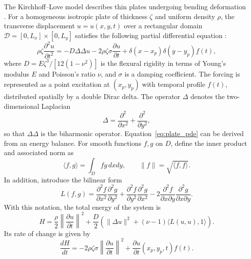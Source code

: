 The Kirchhoff--Love model describes thin plates undergoing bending deformation \cite{love_small_1888}. For a homogeneous isotropic plate of thickness $\zeta$ and uniform density $\rho$, the transverse displacement $u = u(x,y,t)$ over a rectangular domain ${\mathcal D} = [0,L_x]\times[0,L_y]$ satisfies the following partial differential equation \cite{graff_wave_1991,bilbao_numerical_2009}:
%
\begin{equation}
\rho \zeta \frac{\partial^2 u}{\partial t^2}
= -D \Delta \Delta u - 2 \rho \zeta \sigma \frac{\partial u}{\partial t}
+ \delta(x - x_p)\delta(y - y_p) f(t),
\label{eq:plate_pde}
\end{equation}
%
where $D = E \zeta^3/[12(1-\nu^2)]$ is the flexural rigidity in terms of Young's modulus $E$ and Poisson's ratio $\nu$, and $\sigma$ is a damping coefficient. The forcing is represented as a point excitation at $(x_p,y_p)$ with temporal profile $f(t)$, distributed spatially by a double Dirac delta. The operator $\Delta$ denotes the two-dimensional Laplacian
%
\begin{equation}
\Delta = \frac{\partial^2}{\partial x^2} + \frac{\partial^2}{\partial y^2},
\label{eq:laplacian}
\end{equation}
%
so that $\Delta\Delta$ is the biharmonic operator. Equation~\eqref{eq:plate_pde} can be derived from an energy balance. For smooth functions $f,g$ on $D$, define the inner product and associated norm as
%
\begin{equation}
\langle f,g \rangle = \int_D f g \, dx dy, \qquad 
\| f \| = \sqrt{\langle f,f \rangle}.
\end{equation}
%
In addition, introduce the bilinear form
%
\begin{equation}
L(f,g) = \frac{\partial^2 f}{\partial x^2}\frac{\partial^2 g}{\partial y^2}
+ \frac{\partial^2 f}{\partial y^2}\frac{\partial^2 g}{\partial x^2}
- 2 \frac{\partial^2 f}{\partial x \partial y}\frac{\partial^2 g}{\partial x \partial y}.
\end{equation}
%
With this notation, the total energy of the system is
%
\begin{equation}
H = \frac{\rho}{2} \left\| \frac{\partial u}{\partial t} \right\|^2
+ \frac{D}{2} \left( \| \Delta u \|^2 + (\nu-1)\langle L(u,u),1\rangle \right).
\end{equation}
%
Its rate of change is given by
%
\begin{equation}
\frac{dH}{dt} = -2 \rho \zeta \sigma \left\| \frac{\partial u}{\partial t} \right\|^2
+ \frac{\partial u}{\partial t}(x_p,y_p,t) f(t).
\end{equation}
